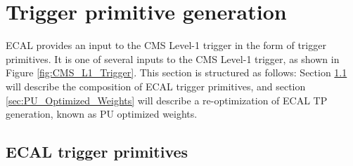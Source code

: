 \section{Trigger primitive generation} \label{sec:ECAL_TPG}

ECAL provides an input to the CMS Level-1 trigger in the form of trigger primitives. It is one of several inputs to the CMS Level-1 trigger, as shown in Figure \ref{fig:CMS_L1_Trigger}. This section is structured as follows: Section \ref{sec:ECAL_TP} will describe the composition of ECAL trigger primitives, and section \ref{sec:PU_Optimized_Weights} will describe a re-optimization of ECAL TP generation, known as PU optimized weights.  

\subsection{ECAL trigger primitives} \label{sec:ECAL_TP}

